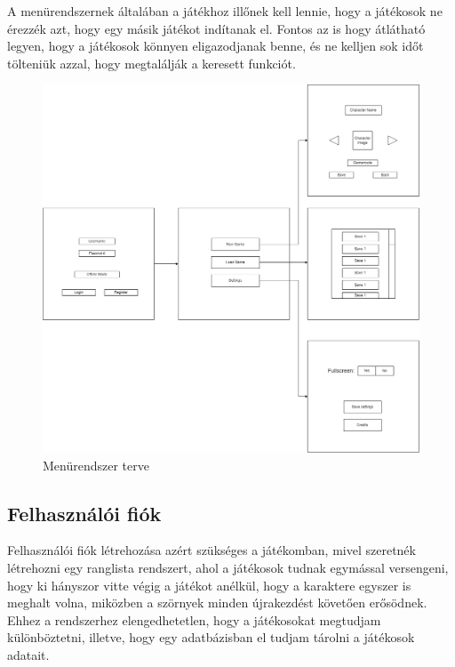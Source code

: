 A menürendszernek általában a játékhoz illőnek kell lennie, hogy a játékosok ne érezzék azt, hogy egy másik játékot indítanak el. Fontos az is hogy átlátható legyen, hogy a játékosok könnyen eligazodjanak benne, és ne kelljen sok időt tölteniük azzal, hogy megtalálják a keresett funkciót.

\begin{figure}[H]
    \centering
    \includegraphics[width=14.0truecm]{images/MS_menu.drawio.png}
    \caption{Menürendszer terve}
    \label{fig:Menürendszer terve}
\end{figure}

\subsection{Felhasználói fiók}
Felhasználói fiók létrehozása azért szükséges a játékomban, mivel szeretnék létrehozni egy ranglista rendszert, ahol a játékosok tudnak egymással versengeni, hogy ki hányszor vitte végig a játékot anélkül, hogy a karaktere egyszer is meghalt volna, miközben a szörnyek minden újrakezdést követően erősödnek. Ehhez a rendszerhez elengedhetetlen, hogy a játékosokat megtudjam különböztetni, illetve, hogy egy adatbázisban el tudjam tárolni a játékosok adatait.

